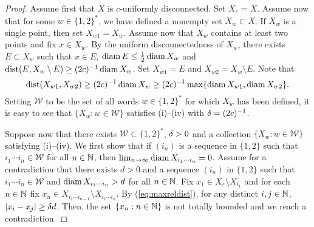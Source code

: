 \documentclass{amsart}
\DeclareMathOperator{\dist}{dist}
\begin{document}
\begin{proof}
Assume first that $X$ is $c$-uniformly disconnected. 
Set $X_{\varepsilon} = X$. Assume now that for some $w\in\{1,2\}^*$, we have defined a nonempty set $X_w \subset X$. If $X_w$ is a single point, then set $X_{w1}=X_w$. Assume now that $X_w$ contains at least two points and fix $x\in X_w$. By the uniform disconnectedness of $X_w$, there exists $E \subset X_w$ such that $x\in E$, $\operatorname{diam}{E}\leq \frac12\operatorname{diam}{X_w}$ and $\dist(E,X_w\setminus E)\geq (2c)^{-1}\diam{X_w}$. Set $X_{w1} = E$ and $X_{w2}=X_w\setminus E$. Note that
\[ \dist(X_{w1},X_{w2}) \geq (2c)^{-1}\diam{X_w} \geq (2c)^{-1}\max\{\diam{X_{w1}}, \diam{X_{w2}}\}.\]
Setting $\mathcal{W}$ to be the set of all words $w \in \{1,2\}^*$ for which $X_w$ has been defined, it is easy to see that $\{X_w : w\in\mathcal{W}\}$ satisfies (i)--(iv) with $\delta = (2c)^{-1}$.

Suppose now that there exists $\mathcal{W}\subset\{1,2\}^*$, $\delta>0$ and a collection $\{X_w: w\in\mathcal{W}\}$ satisfying (i)--(iv). We first show that if $(i_n)$ is a sequence in $\{1,2\}$ such that $i_1\cdots i_n \in \mathcal{W}$ for all $n\in\mathbb{N}$, then $\lim_{n\to \infty}\operatorname{diam}{X_{i_1\cdots i_n}} =0$. Assume for a contradiction that there exists $d>0$ and a sequence $(i_n)$ in $\{1,2\}$ such that $i_1\cdots i_n \in \mathcal{W}$ and $\operatorname{diam}{X_{i_1\cdots i_n}} >d $ for all $n\in\mathbb{N}$. Fix $x_1 \in X_{\varepsilon} \setminus X_{i_1}$ and for each $n\in\mathbb{N}$ fix $x_n \in X_{i_1\cdots i_{n-1}} \setminus X_{i_1\cdots i_n}$. By (\ref{eq:maxreldist}), for any distinct $i,j \in \mathbb{N}$, $|x_i - x_j| \geq\delta d$. Then, the set $\{x_n : n\in\mathbb{N}\}$ is not totally bounded and we reach a contradiction.



\end{proof}
\end{document}
